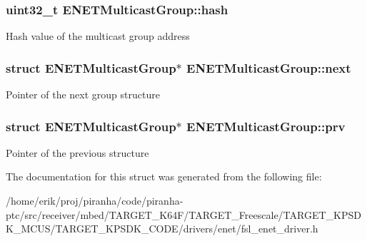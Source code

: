 \subsubsection[{\texorpdfstring{hash}{hash}}]{\setlength{\rightskip}{0pt plus 5cm}uint32\+\_\+t E\+N\+E\+T\+Multicast\+Group\+::hash}\hypertarget{structENETMulticastGroup_a9ccae04af5f5dbc73f1d3019b891c1bb}{}\label{structENETMulticastGroup_a9ccae04af5f5dbc73f1d3019b891c1bb}
Hash value of the multicast group address 
\subsubsection[{\texorpdfstring{next}{next}}]{\setlength{\rightskip}{0pt plus 5cm}struct {\bf E\+N\+E\+T\+Multicast\+Group}$\ast$ E\+N\+E\+T\+Multicast\+Group\+::next}\hypertarget{structENETMulticastGroup_a65d657203ab5d28b05388e0076de2d52}{}\label{structENETMulticastGroup_a65d657203ab5d28b05388e0076de2d52}
Pointer of the next group structure 
\subsubsection[{\texorpdfstring{prv}{prv}}]{\setlength{\rightskip}{0pt plus 5cm}struct {\bf E\+N\+E\+T\+Multicast\+Group}$\ast$ E\+N\+E\+T\+Multicast\+Group\+::prv}\hypertarget{structENETMulticastGroup_ac910b731675e856af7ae052ecc641574}{}\label{structENETMulticastGroup_ac910b731675e856af7ae052ecc641574}
Pointer of the previous structure 

The documentation for this struct was generated from the following file\+:\begin{DoxyCompactItemize}
\item 
/home/erik/proj/piranha/code/piranha-\/ptc/src/receiver/mbed/\+T\+A\+R\+G\+E\+T\+\_\+\+K64\+F/\+T\+A\+R\+G\+E\+T\+\_\+\+Freescale/\+T\+A\+R\+G\+E\+T\+\_\+\+K\+P\+S\+D\+K\+\_\+\+M\+C\+U\+S/\+T\+A\+R\+G\+E\+T\+\_\+\+K\+P\+S\+D\+K\+\_\+\+C\+O\+D\+E/drivers/enet/fsl\+\_\+enet\+\_\+driver.\+h\end{DoxyCompactItemize}

